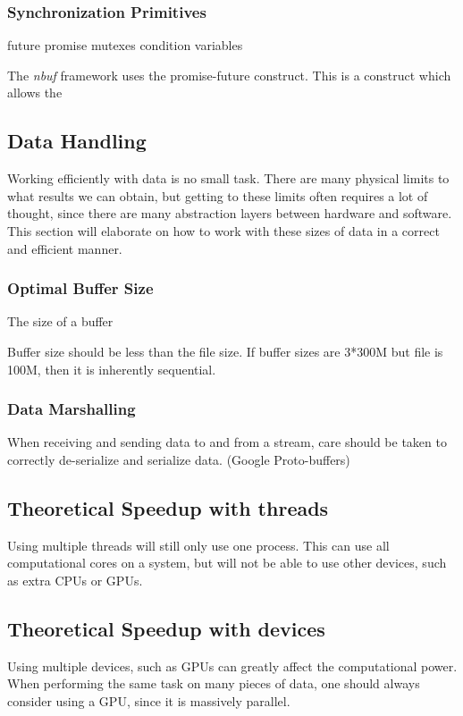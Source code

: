 \documentclass[a4paper]{article}
\newcommand{\nbuf}{\textit{nbuf} }
\begin{document}
\subsubsection{Synchronization Primitives}
future 
promise
mutexes
condition variables

The \nbuf framework uses the promise-future construct. This is a construct which allows the 


\newpage
\subsection{Data Handling}
Working efficiently with data is no small task. There are many physical limits to what results we can obtain, but getting
to these limits often requires a lot of thought, since there are many abstraction layers between hardware and software. This section
will elaborate on how to work with these sizes of data in a correct and efficient manner.


\subsubsection{Optimal Buffer Size}
The size of a buffer

Buffer size should be less than the file size. If buffer sizes are 3*300M but file is 100M,
then it is inherently sequential.



\subsubsection{Data Marshalling}
When receiving and sending data to and from a stream, care should be taken to correctly de-serialize and serialize data.
(Google Proto-buffers)



\subsection{Theoretical Speedup with threads}
Using multiple threads will still only use one process. This can use all computational cores on a system, but will not be able to use other devices, such as extra CPUs or GPUs.



\subsection{Theoretical Speedup with devices}
Using multiple devices, such as GPUs can greatly affect the computational power. When performing the same task on many pieces
of data, one should always consider using a GPU, since it is massively parallel.
\end{document}
